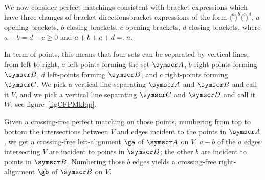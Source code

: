 \label{sectionThreeChanges}
We now consider perfect matchings consistent with bracket expressions which have three
changes of bracket directions\idest bracket expressions of the form
$\langle^a\rangle^b\langle^c\rangle^d$,
$a$ opening brackets, $b$ closing brackets, $c$ opening brackets, $d$ closing brackets, where
$a-b=d-c\geq 0$ and $a+b+c+d=: n$.

In term of points, this means that four sets can be separated by vertical lines, from left
to right, $a$ left-points forming the set $\pointset A$, $b$ right-points forming $\pointset B$,
$d$ left-points
forming $\pointset D$, and $c$ right-points forming $\pointset C$.
We pick a vertical line separating $\pointset A$ and $\pointset B$ and call it $V$, and we pick
a vertical line separating $\pointset C$ and $\pointset D$ and call it $W$,
see figure~\ref{figCFPMklqp}.

Given a crossing-free perfect matching on those points, numbering from top to bottom the
intersections between $V$ and edges incident to the points in $\pointset A$,
we get a crossing-free left-alignment $\ga$ of $\pointset A$ on $V$. $a-b$ of the $a$ edges
intersecting $V$
are incident to points in $\pointset D$; the other $b$ are incident to points in $\pointset B$.
Numbering those $b$ edges yields a crossing-free right-alignment $\gb$ of $\pointset B$ on $V$.

